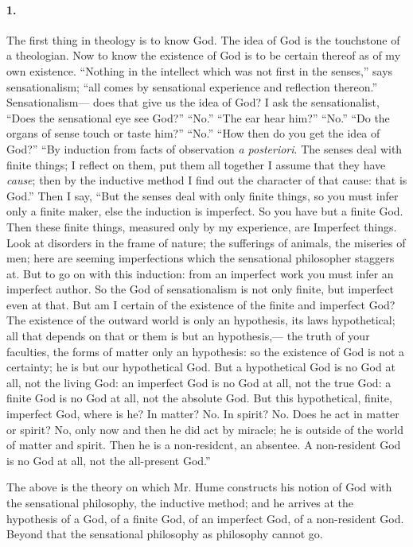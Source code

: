 \documentclass[12pt]{article}
\begin{document}
\paragraph{1.} The first thing in theology is to know God. The idea of God is the touchstone of a theologian. Now to know the existence of God is to be certain thereof as of my own existence. ``Nothing in the intellect which was not first in the senses,'' says sensationalism; ``all comes by sensational experience and reflection thereon.'' Sensationalism--- does that give us the idea of God? I ask the sensationalist, ``Does the sensational eye see God?'' ``No.'' ``The ear hear him?'' ``No.'' ``Do the organs of sense touch or taste him?'' ``No.'' ``How then do you get the idea of God?'' ``By induction from facts of observation \emph{a posteriori}. The senses deal with finite things; I reflect on them, put them all together I assume that they have \emph{cause}; then by the inductive method I find out the character of that cause: that is God.'' Then I say, ``But the senses deal with only finite things, so you must infer only a finite maker, else the induction is imperfect. So you have but a finite God. Then these finite things, measured only by my experience, are Imperfect things. Look at disorders in the frame of nature; the sufferings of animals, the miseries of men; here are seeming imperfections which the sensational philosopher staggers at. But to go on with this induction: from an imperfect work you must infer an imperfect author. So the God of sensationalism is not only finite, but imperfect even at that. But am I certain of the existence of the finite and imperfect God? The existence of the outward world is only an hypothesis, its laws hypothetical; all that depends on that or them is but an hypothesis,--- the truth of your faculties, the forms of matter only an hypothesis: so the existence of God is not a certainty; he is but our hypothetical God. But a hypothetical God is no God at all, not the living God: an imperfect God is no God at all, not the true God: a finite God is no God at all, not the absolute God. But this hypothetical, finite, imperfect God, where is he? In matter? No. In spirit? No. Does he act in matter or spirit? No, only now and then he did act by miracle; he is outside of the world of matter and spirit. Then he is a non-residcnt, an absentee. A non-resident God is no God at all, not the all-present God.'' 

The above is the theory on which Mr. Hume constructs his notion of God with the sensational philosophy, the inductive method; and he arrives at the hypothesis of a God, of a finite God, of an imperfect God, of a non-resident God. Beyond that the sensational philosophy as philosophy cannot go. 
\end{document}
